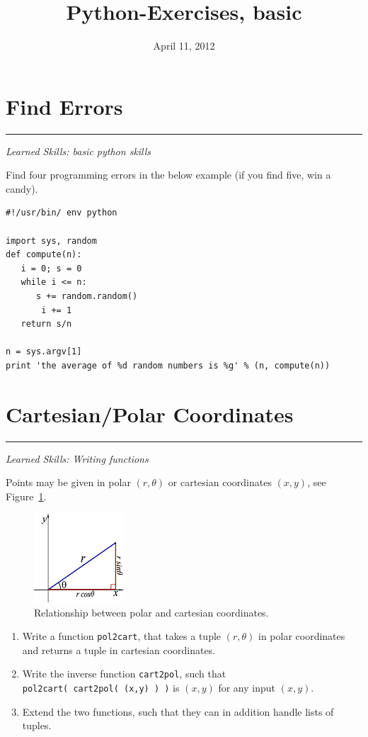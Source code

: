 \documentclass[smallheadings,12pt]{scrartcl}
\newcommand{\skills}[1]{\rule{1cm}{0pt}{\begin{minipage}{.8\textwidth}\small\em
      Learned Skills:  #1\end{minipage}}}
\begin{document}
\parindent0cm
\pagestyle{myheadings}
\title{Python-Exercises, basic}
\date{April 11, 2012}
\lstset{language=Python,numbers=left,frame=shadowbox}

\maketitle

\section{Find Errors}
\skills{basic python skills}

Find four programming errors in the below example (if you find five,
win a candy).
\begin{lstlisting}
#!/usr/bin/ env python

import sys, random
def compute(n):
   i = 0; s = 0
   while i <= n:
      s += random.random()
       i += 1
   return s/n

n = sys.argv[1]
print 'the average of %d random numbers is %g' % (n, compute(n))
\end{lstlisting}


\section{Cartesian/Polar Coordinates}
\skills{Writing functions}

Points may be given in polar $(r,\theta)$ or cartesian coordinates
$(x,y)$, see Figure~\ref{fig:pol2cart}.
\begin{figure}[H]
  \centering
  \includegraphics[width=0.3\textwidth]{pics/pol2cart}
  \caption{Relationship between polar and cartesian coordinates.\label{fig:pol2cart}}
\end{figure}

\begin{enumerate}
\item Write a function \texttt{pol2cart}, that takes a tuple $(r,\theta)$ in polar
  coordinates and returns a tuple in cartesian coordinates. 
\item Write the inverse function \texttt{cart2pol}, such that {\tt
  pol2cart(~cart2pol(~(x,y)~)~)} is $(x,y)$ for any input $(x,y)$.
\item Extend the two functions, such that they can in addition handle
  lists of tuples.
\end{enumerate}
\end{document}
